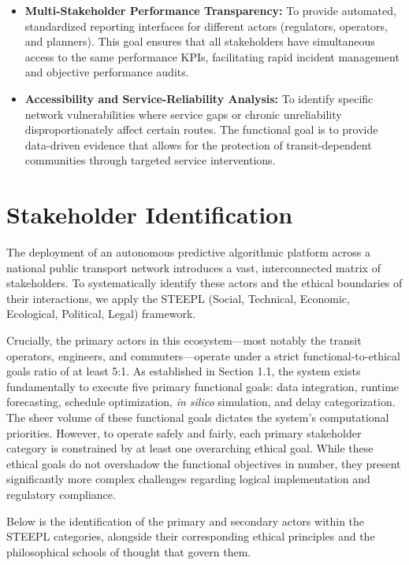 \documentclass[]
{UCD_CS_41820_Report}
\begin{document}
\begin{itemize}
  \item \textbf{Multi-Stakeholder Performance Transparency:} To provide automated, standardized reporting interfaces for different actors (regulators, operators, and planners). This goal ensures that all stakeholders have simultaneous access to the same performance KPIs, facilitating rapid incident management and objective performance audits.

  \item \textbf{Accessibility and Service-Reliability Analysis:} To identify specific network vulnerabilities where service gaps or chronic unreliability disproportionately affect certain routes. The functional goal is to provide data-driven evidence that allows for the protection of transit-dependent communities through targeted service interventions.
\end{itemize}


\chapter{Stakeholder Identification}
The deployment of an autonomous predictive algorithmic platform across a national public transport network introduces a vast, interconnected matrix of stakeholders. To systematically identify these actors and the ethical boundaries of their interactions, we apply the STEEPL (Social, Technical, Economic, Ecological, Political, Legal) framework.

Crucially, the primary actors in this ecosystem—most notably the transit operators, engineers, and commuters—operate under a strict functional-to-ethical goals ratio of at least 5:1. As established in Section 1.1, the system exists fundamentally to execute five primary functional goals: data integration, runtime forecasting, schedule optimization, \textit{in silico} simulation, and delay categorization. The sheer volume of these functional goals dictates the system's computational priorities. However, to operate safely and fairly, each primary stakeholder category is constrained by at least one overarching ethical goal. While these ethical goals do not overshadow the functional objectives in number, they present significantly more complex challenges regarding logical implementation and regulatory compliance.

Below is the identification of the primary and secondary actors within the STEEPL categories, alongside their corresponding ethical principles and the philosophical schools of thought that govern them.
\end{document}
